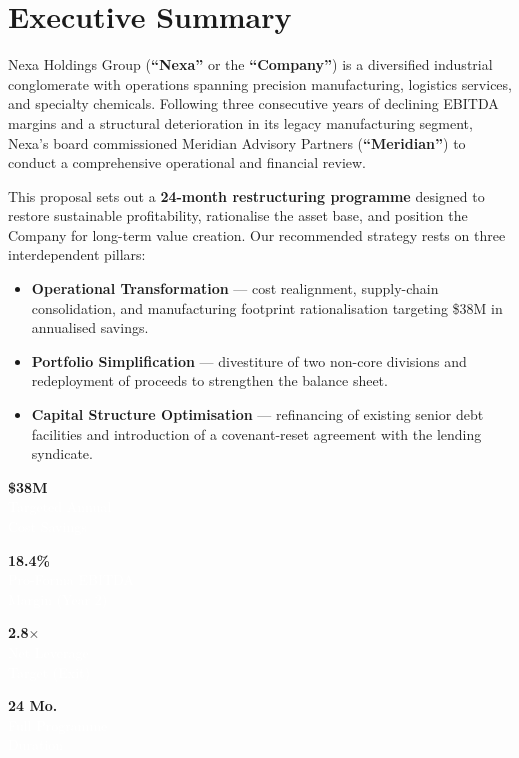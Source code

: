 \documentclass[11pt,a4paper]{article}
\newcommand{\kpiblock}[2]{%
  \begin{tcolorbox}[kpibox]
    \textcolor{GoldAccent}{\large\bfseries #1}\\[2pt]
    \textcolor{white}{\footnotesize #2}
  \end{tcolorbox}%
}
\begin{document}
\vspace{12pt}

\section{Executive Summary}

Nexa Holdings Group (\textbf{``Nexa''} or the \textbf{``Company''}) is a diversified industrial
conglomerate with operations spanning precision manufacturing, logistics services, and specialty
chemicals. Following three consecutive years of declining EBITDA margins and a structural
deterioration in its legacy manufacturing segment, Nexa's board commissioned Meridian Advisory
Partners (\textbf{``Meridian''}) to conduct a comprehensive operational and financial review.

This proposal sets out a \textbf{24-month restructuring programme} designed to restore sustainable
profitability, rationalise the asset base, and position the Company for long-term value creation.
Our recommended strategy rests on three interdependent pillars:

\begin{itemize}[leftmargin=1.4em,itemsep=4pt]
  \item[\textcolor{GoldAccent}{\textbullet}]
    \textbf{Operational Transformation} — cost realignment, supply-chain consolidation, and
    manufacturing footprint rationalisation targeting \$38M in annualised savings.
  \item[\textcolor{GoldAccent}{\textbullet}]
    \textbf{Portfolio Simplification} — divestiture of two non-core divisions and redeployment
    of proceeds to strengthen the balance sheet.
  \item[\textcolor{GoldAccent}{\textbullet}]
    \textbf{Capital Structure Optimisation} — refinancing of existing senior debt facilities
    and introduction of a covenant-reset agreement with the lending syndicate.
\end{itemize}

\vspace{10pt}

\noindent
\begin{minipage}[t]{0.23\textwidth}
  \kpiblock{\$38M}{Targeted Annual\\ Cost Savings}
\end{minipage}\hfill
\begin{minipage}[t]{0.23\textwidth}
  \kpiblock{18.4\%}{Pro-Forma EBITDA\\ Margin (Year 2)}
\end{minipage}\hfill
\begin{minipage}[t]{0.23\textwidth}
  \kpiblock{2.8$\times$}{Net Leverage\\ Target (Exit)}
\end{minipage}\hfill
\begin{minipage}[t]{0.23\textwidth}
  \kpiblock{24 Mo.}{Full Programme\\ Duration}
\end{minipage}
\end{document}
